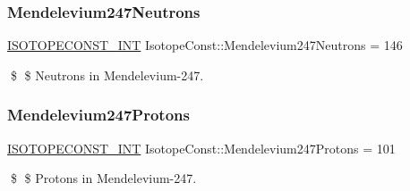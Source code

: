 \subsubsection{\texorpdfstring{Mendelevium247\+Neutrons}{Mendelevium247Neutrons}}
{\footnotesize\ttfamily \mbox{\hyperlink{group___isotope_const-_macros_ga5f18360b3e99483a35c32d789e62621c}{I\+S\+O\+T\+O\+P\+E\+C\+O\+N\+S\+T\+\_\+\+I\+NT}} Isotope\+Const\+::\+Mendelevium247\+Neutrons = 146}

\$ \$ Neutrons in Mendelevium-\/247. \mbox{\label{group___isotope_const-_mendelevium-_md247_gabfbcb632743788969e7d8dc5b63f354b}} 
\subsubsection{\texorpdfstring{Mendelevium247\+Protons}{Mendelevium247Protons}}
{\footnotesize\ttfamily \mbox{\hyperlink{group___isotope_const-_macros_ga5f18360b3e99483a35c32d789e62621c}{I\+S\+O\+T\+O\+P\+E\+C\+O\+N\+S\+T\+\_\+\+I\+NT}} Isotope\+Const\+::\+Mendelevium247\+Protons = 101}

\$ \$ Protons in Mendelevium-\/247. 